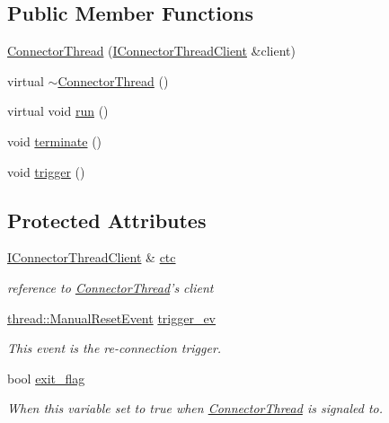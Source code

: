 \subsection*{Public Member Functions}
\begin{DoxyCompactItemize}
\item 
\hyperlink{classlog4cplus_1_1helpers_1_1ConnectorThread_a7ffe2b0b077e7a9fb70f01a237dcfc2e}{Connector\-Thread} (\hyperlink{classlog4cplus_1_1helpers_1_1IConnectorThreadClient}{I\-Connector\-Thread\-Client} \&client)
\item 
virtual \hyperlink{classlog4cplus_1_1helpers_1_1ConnectorThread_aba89577da485e8afa590c938b1bf7229}{$\sim$\-Connector\-Thread} ()
\item 
virtual void \hyperlink{classlog4cplus_1_1helpers_1_1ConnectorThread_a1153bf634862c1d555e8d44f87df8b71}{run} ()
\item 
void \hyperlink{classlog4cplus_1_1helpers_1_1ConnectorThread_a85d5a32bd3a6e32291dafff7e87d5ed1}{terminate} ()
\item 
void \hyperlink{classlog4cplus_1_1helpers_1_1ConnectorThread_aa3fd7ed4ecbd33f15e817ad22c3b07bb}{trigger} ()
\end{DoxyCompactItemize}
\subsection*{Protected Attributes}
\begin{DoxyCompactItemize}
\item 
\hyperlink{classlog4cplus_1_1helpers_1_1IConnectorThreadClient}{I\-Connector\-Thread\-Client} \& \hyperlink{classlog4cplus_1_1helpers_1_1ConnectorThread_a77c47fd9b4381f10122379ad987c8e85}{ctc}
\begin{DoxyCompactList}\small\item\em reference to \hyperlink{classlog4cplus_1_1helpers_1_1ConnectorThread}{Connector\-Thread}'s client \end{DoxyCompactList}\item 
\hyperlink{classlog4cplus_1_1thread_1_1ManualResetEvent}{thread\-::\-Manual\-Reset\-Event} \hyperlink{classlog4cplus_1_1helpers_1_1ConnectorThread_a9c417c4e798183677abaa3c7a6c9f006}{trigger\-\_\-ev}
\begin{DoxyCompactList}\small\item\em This event is the re-\/connection trigger. \end{DoxyCompactList}\item 
bool \hyperlink{classlog4cplus_1_1helpers_1_1ConnectorThread_af1141ad4cbbfa7fbd9035975e0c74a03}{exit\-\_\-flag}
\begin{DoxyCompactList}\small\item\em When this variable set to true when \hyperlink{classlog4cplus_1_1helpers_1_1ConnectorThread}{Connector\-Thread} is signaled to. \end{DoxyCompactList}\end{DoxyCompactItemize}
